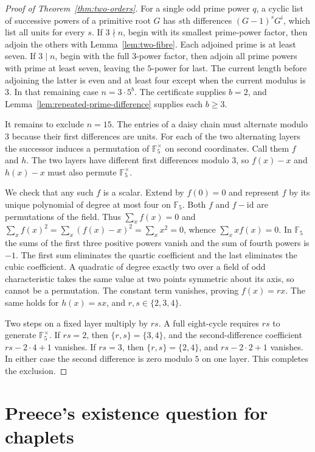 \documentclass[11pt,a4paper]{article}
\begin{document}
\begin{proof}[Proof of Theorem~\ref{thm:two-orders}]
For a single odd prime power $q$, a cyclic list of successive powers of a primitive root $G$ has $s$th differences $(G-1)^s G^i$, which list all units for every $s$. If $3\nmid n$, begin with its smallest prime-power factor, then adjoin the others with Lemma~\ref{lem:two-fibre}. Each adjoined prime is at least seven. If $3\mid n$, begin with the full $3$-power factor, then adjoin all prime powers with prime at least seven, leaving the $5$-power for last. The current length before adjoining the latter is even and at least four except when the current modulus is $3$. In that remaining case $n=3\cdot5^b$. The certificate supplies $b=2$, and Lemma~\ref{lem:repeated-prime-difference} supplies each $b\ge3$.

It remains to exclude $n=15$. The entries of a daisy chain must alternate modulo $3$ because their first differences are units. For each of the two alternating layers the successor induces a permutation of $\mathbb F_5^\times$ on second coordinates. Call them $f$ and $h$. The two layers have different first differences modulo $3$, so $f(x)-x$ and $h(x)-x$ must also permute $\mathbb F_5^\times$.

We check that any such $f$ is a scalar. Extend by $f(0)=0$ and represent $f$ by its unique polynomial of degree at most four on $\mathbb F_5$. Both $f$ and $f-\mathrm{id}$ are permutations of the field. Thus $\sum_x f(x)=0$ and $\sum_x f(x)^2=\sum_x (f(x)-x)^2=\sum_x x^2=0$, whence $\sum_x x f(x)=0$. In $\mathbb F_5$ the sums of the first three positive powers vanish and the sum of fourth powers is $-1$. The first sum eliminates the quartic coefficient and the last eliminates the cubic coefficient. A quadratic of degree exactly two over a field of odd characteristic takes the same value at two points symmetric about its axis, so cannot be a permutation. The constant term vanishes, proving $f(x)=rx$. The same holds for $h(x)=sx$, and $r,s\in\{2,3,4\}$.

Two steps on a fixed layer multiply by $rs$. A full eight-cycle requires $rs$ to generate $\mathbb F_5^\times$. If $rs=2$, then $\{r,s\}=\{3,4\}$, and the second-difference coefficient $rs-2\cdot4+1$ vanishes. If $rs=3$, then $\{r,s\}=\{2,4\}$, and $rs-2\cdot2+1$ vanishes. In either case the second difference is zero modulo $5$ on one layer. This completes the exclusion.
\end{proof}
\section{Preece's existence question for chaplets}
\label{sec:chaplets}
\end{document}
